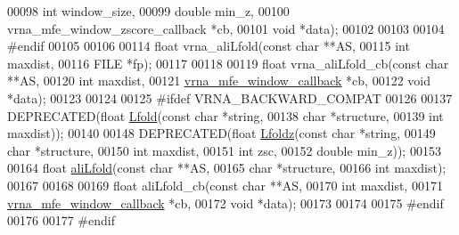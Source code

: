 \begin{DoxyCode}
00098                \textcolor{keywordtype}{int}                              window\_size,
00099                \textcolor{keywordtype}{double}                           min\_z,
00100                vrna\_mfe\_window\_zscore\_callback  *cb,
00101                \textcolor{keywordtype}{void}                             *data);
00102 
00103 
00104 \textcolor{preprocessor}{#endif}
00105 
00106 
00114 \textcolor{keywordtype}{float} vrna\_aliLfold(\textcolor{keyword}{const} \textcolor{keywordtype}{char}  **AS,
00115                     \textcolor{keywordtype}{int}         maxdist,
00116                     FILE        *fp);
00117 
00118 
00119 \textcolor{keywordtype}{float} vrna\_aliLfold\_cb(\textcolor{keyword}{const} \textcolor{keywordtype}{char}               **AS,
00120                        \textcolor{keywordtype}{int}                      maxdist,
00121                        \hyperlink{group__mfe__fold_ga4f3e5bc214ef803074ace313cb9571b4}{vrna\_mfe\_window\_callback} *cb,
00122                        \textcolor{keywordtype}{void}                     *data);
00123 
00124 
00125 \textcolor{preprocessor}{#ifdef  VRNA\_BACKWARD\_COMPAT}
00126 
00137 DEPRECATED(\textcolor{keywordtype}{float} \hyperlink{group__local__mfe__fold_ga16e5a70e60835bb969eaecbe6482f1be}{Lfold}(\textcolor{keyword}{const} \textcolor{keywordtype}{char} *\textcolor{keywordtype}{string},
00138                        \textcolor{keywordtype}{char}       *structure,
00139                        \textcolor{keywordtype}{int}        maxdist));
00140 
00148 DEPRECATED(\textcolor{keywordtype}{float} \hyperlink{group__local__mfe__fold_gab6d79eecc180f586679f7b85cce5cbe9}{Lfoldz}(\textcolor{keyword}{const} \textcolor{keywordtype}{char}  *\textcolor{keywordtype}{string},
00149                         \textcolor{keywordtype}{char}        *structure,
00150                         \textcolor{keywordtype}{int}         maxdist,
00151                         \textcolor{keywordtype}{int}         zsc,
00152                         \textcolor{keywordtype}{double}      min\_z));
00153 
00164 \textcolor{keywordtype}{float} \hyperlink{group__local__consensus__fold_ga864db0f9c428356d978ad0600aa9a8bc}{aliLfold}(\textcolor{keyword}{const} \textcolor{keywordtype}{char} **AS,
00165                \textcolor{keywordtype}{char}       *structure,
00166                \textcolor{keywordtype}{int}        maxdist);
00167 
00168 
00169 \textcolor{keywordtype}{float} aliLfold\_cb(\textcolor{keyword}{const} \textcolor{keywordtype}{char}                **AS,
00170                   \textcolor{keywordtype}{int}                       maxdist,
00171                   \hyperlink{group__mfe__fold_ga4f3e5bc214ef803074ace313cb9571b4}{vrna\_mfe\_window\_callback}  *cb,
00172                   \textcolor{keywordtype}{void}                      *data);
00173 
00174 
00175 \textcolor{preprocessor}{#endif}
00176 
00177 \textcolor{preprocessor}{#endif}
\end{DoxyCode}

